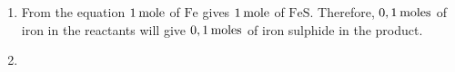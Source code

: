 {\begin{mdframed}[linewidth=4, leftmargin=40, rightmargin=40]
\begin{exercise}
\begin{enumerate}[noitemsep, label=\textbf{Step} \textbf{\arabic*}. ]
      
      \item  
      \label{m38712*id284488}From the equation \begin{math}1\phantom{\rule{2pt}{0ex}}\mathrm{mole}\end{math} of \begin{math}\mathrm{Fe}\end{math} gives \begin{math}1\phantom{\rule{2pt}{0ex}}\mathrm{mole}\end{math} of \begin{math}\mathrm{FeS}\end{math}. Therefore, \begin{math}0,1\phantom{\rule{2pt}{0ex}}\mathrm{moles}\end{math} of iron in the reactants will give \begin{math}0,1\phantom{\rule{2pt}{0ex}}\mathrm{moles}\end{math} of iron sulphide in the product.\par 
      \item  
      \label{m38712*id284499}\nopagebreak\noindent{}
    

\end{enumerate}
\end{exercise}
\end{mdframed}}
